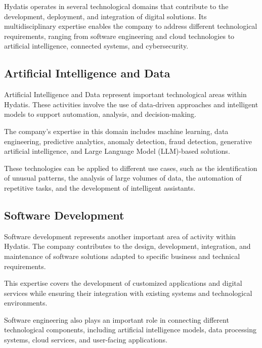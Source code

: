 \documentclass[12pt,a4paper]{report}
\begin{document}
Hydatis operates in several technological domains that contribute to the development, deployment, and integration of digital solutions. Its multidisciplinary expertise enables the company to address different technological requirements, ranging from software engineering and cloud technologies to artificial intelligence, connected systems, and cybersecurity.

\subsection{Artificial Intelligence and Data}

Artificial Intelligence and Data represent important technological areas within Hydatis. These activities involve the use of data-driven approaches and intelligent models to support automation, analysis, and decision-making.

The company's expertise in this domain includes machine learning, data engineering, predictive analytics, anomaly detection, fraud detection, generative artificial intelligence, and Large Language Model (LLM)-based solutions.

These technologies can be applied to different use cases, such as the identification of unusual patterns, the analysis of large volumes of data, the automation of repetitive tasks, and the development of intelligent assistants.

\subsection{Software Development}

Software development represents another important area of activity within Hydatis. The company contributes to the design, development, integration, and maintenance of software solutions adapted to specific business and technical requirements.

This expertise covers the development of customized applications and digital services while ensuring their integration with existing systems and technological environments.

Software engineering also plays an important role in connecting different technological components, including artificial intelligence models, data processing systems, cloud services, and user-facing applications.
\end{document}
